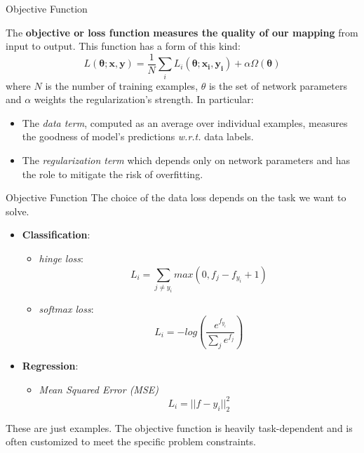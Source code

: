 \documentclass[aspectratio=169]{beamer}
\begin{document}
\begin{frame}{Objective Function}

The \textbf{objective or loss function} \textbf{measures the quality of our mapping} from input to output. This function has a form of this kind:
\begin{equation*}
L(\bm{\theta}; \mathbf{x, y})=\frac{1}{N} \sum_i L_i(\bm{\theta}; \mathbf{x_i, y_i}) + \alpha \Omega (\bm{\theta})
\end{equation*}
where $N$ is the number of training examples, $\theta$ is the set of network parameters and $\alpha$ weights the regularization's strength.
In particular:
\begin{itemize}
\item The \emph{data term}, computed as an average over individual examples, measures the goodness of model's predictions \textit{w.r.t.} data labels. 
\item The \emph{regularization term} which depends only on network parameters and has the role to mitigate the risk of overfitting.
\end{itemize}
\end{frame}


\begin{frame}{Objective Function}
The choice of the data loss depends on the task we want to solve.
\begin{itemize}
	\item \textbf{Classification}:
	\begin{itemize}
		\item \emph{hinge loss}:
		\begin{equation}
		L_i = \sum_{j\neq y_i}max(0, f_j - f_{y_i} + 1)
		\end{equation}
		\item \emph{softmax loss}:
		\begin{equation}
		L_i = -log\left(\frac{e^{f_{y_i}}}{\sum_j e^{f_j}}\right)
		\end{equation}
	\end{itemize}
	\item \textbf{Regression}:
	\begin{itemize}
		\item \emph{Mean Squared Error (MSE)}
		\begin{equation}
		L_i = || f - y_i ||^2_2
		\end{equation}
	\end{itemize}
\end{itemize}
These are just examples. The objective function is heavily task-dependent and is often customized to meet the specific problem constraints.
\end{frame}
\end{document}
